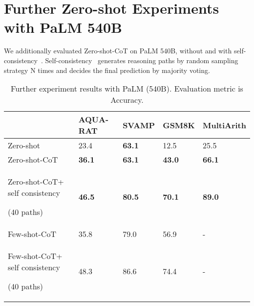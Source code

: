 \documentclass{article}
\newcommand{\ours}{Zero-shot-CoT\xspace}
\newcommand{\theirs}{Few-shot-CoT\xspace}
\newcommand{\theirsz}{Zero-shot\xspace}
\begin{document}
\section{Further Zero-shot Experiments with PaLM 540B}
\label{appx:further_experiment_on_palm}


We additionally evaluated \ours on PaLM 540B, without and with self-consistency~\citep{cot_wei_sc}. Self-consistency~\citep{cot_wei_sc} generates reasoning paths by random sampling strategy N times and decides the final prediction by majority voting.





\begin{table}[h]\centering
\caption{Further experiment results with PaLM (540B). Evaluation metric is Accuracy.}\label{tab:palm_results}
\begin{tabular}{p{}p{}p{}p{}p{}}\toprule
&AQUA-RAT &SVAMP &GSM8K &MultiArith \\\midrule
\theirsz &23.4 &\textbf{63.1} &12.5 &25.5 \\
\ours &\textbf{36.1} &\textbf{63.1} &\textbf{43.0} &\textbf{66.1} \\

\ours + self consistency \par (40 paths) &\textbf{46.5} &\textbf{80.5} &\textbf{70.1} & \textbf{89.0} \\





\midrule
\theirs~\citep{cot_wei} &35.8 &79.0 &56.9 &- \\
\theirs + self consistency \par (40 paths)~\citep{cot_wei_sc} &48.3 &86.6 &74.4 &- \\
\bottomrule
\end{tabular}
\end{table} 
\end{document}
